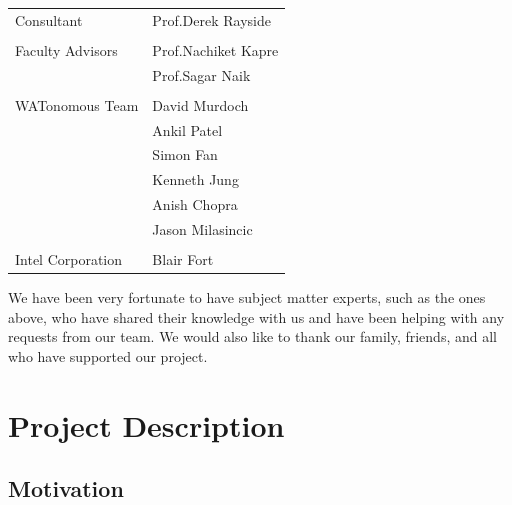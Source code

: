 \documentclass{uw-ece-wkrpt}
\begin{document}
\begin{onehalfspacing}
\begin{flushleft}
\begin{tabular}{l@{\hskip 3cm}l}
    Consultant       & Prof.\@ Derek Rayside \\
    \\
    Faculty Advisors & Prof.\@ Nachiket Kapre \\
                     & Prof.\@ Sagar Naik \\
    \\
    WATonomous Team  & David Murdoch \\
                     & Ankil Patel \\
                     & Simon Fan \\
                     & Kenneth Jung \\
                     & Anish Chopra \\
                     & Jason Milasincic \\
    \\
    Intel Corporation & Blair Fort \\
\end{tabular}
\end{flushleft}

We have been very fortunate to have subject matter experts, such as the ones above, who have shared their knowledge with us and have been helping with any requests from our team. We would also like to thank our family, friends, and all who have supported our project.

\end{onehalfspacing}

\tableofcontents
\listoffigures
\listoftables
\lstlistoflistings
{}

\mainmatter
\glsresetall

\section{Project Description}

\subsection{Motivation}
\end{document}

